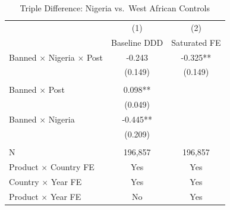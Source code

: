 \begin{table}[htbp]
\centering
\caption{Triple Difference: Nigeria vs.\ West African Controls}
\label{tab:ddd}
\begin{tabular}{lcc}
\toprule
 & (1) & (2) \\
 & Baseline DDD & Saturated FE \\
\midrule
Banned $\times$ Nigeria $\times$ Post & -0.243 & -0.325** \\
 & (0.149) & (0.149) \\
 & & \\
Banned $\times$ Post & 0.098** & \\
 & (0.049) & \\
Banned $\times$ Nigeria & -0.445** & \\
 & (0.209) & \\
 & & \\
N & 196,857 & 196,857 \\
Product $\times$ Country FE & Yes & Yes \\
Country $\times$ Year FE & Yes & Yes \\
Product $\times$ Year FE & No & Yes \\
\bottomrule
\end{tabular}
\par{}
\end{table}
